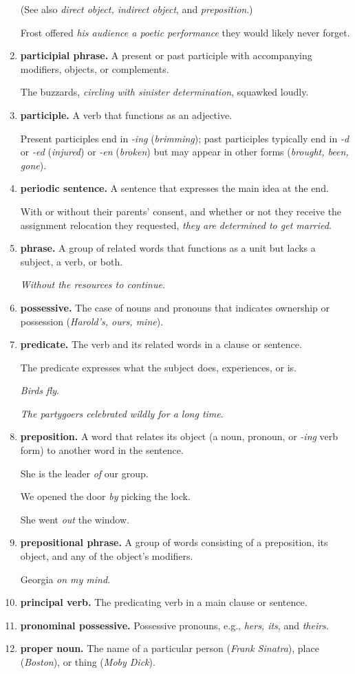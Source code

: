\documentclass{article}
\begin{document}
\begin{enumerate}
	(See also {\it direct object, indirect object}, and {\it preposition}.)
	
	Frost offered {\it his audience a poetic performance} they would likely never forget.
	\item {\bf participial phrase.} A present or past participle with accompanying modifiers, objects, or complements.
	
	The buzzards, {\it circling with sinister determination}, squawked loudly.
	\item {\bf participle.} A verb that functions as an adjective.
	
	Present participles end in {\it -ing} ({\it brimming}); past participles typically end in {\it -d} or {\it -ed} ({\it injured}) or {\it -en} ({\it broken}) but may appear in other forms ({\it brought, been, gone}).
	\item {\bf periodic sentence.} A sentence that expresses the main idea at the end.
	
	With or without their parents' consent, and whether or not they receive the assignment relocation they requested, {\it they are determined to get married}.
	\item {\bf phrase.} A group of related words that functions as a unit but lacks a subject, a verb, or both.
	
	{\it Without the resources to continue}.
	\item {\bf possessive.} The case of nouns and pronouns that indicates ownership or possession ({\it Harold's, ours, mine}).
	\item {\bf predicate.} The verb and its related words in a clause or sentence.
	
	The predicate expresses what the subject does, experiences, or is.
	
	{\it Birds fly}.
	
	{\it The partygoers celebrated wildly for a long time}.
	\item {\bf preposition.} A word that relates its object (a noun, pronoun, or {\it -ing} verb form) to another word in the sentence.
	
	She is the leader {\it of} our group.
	
	We opened the door {\it by} picking the lock.
	
	She went {\it out} the window.
	\item {\bf prepositional phrase.} A group of words consisting of a preposition, its object, and any of the object's modifiers.
	
	Georgia {\it on my mind}.
	\item {\bf principal verb.} The predicating verb in a main clause or sentence.
	\item {\bf pronominal possessive.} Possessive pronouns, e.g., {\it hers, its}, and {\it theirs}.
	\item {\bf proper noun.} The name of a particular person ({\it Frank Sinatra}), place ({\it Boston}), or thing ({\it Moby Dick}).
	

\end{enumerate}
\end{document}
